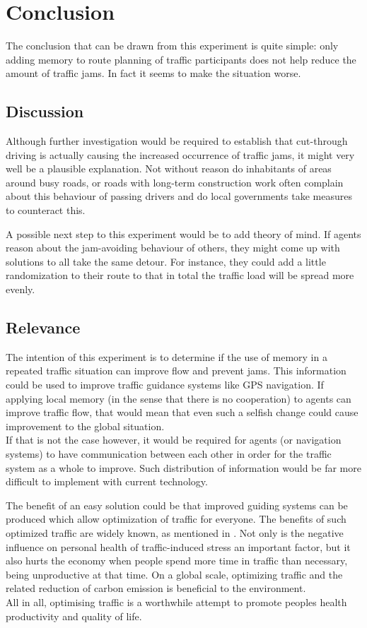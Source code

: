 \documentclass[a4paper,hidelinks]{article}
\begin{document}
\section{Conclusion}
The conclusion that can be drawn from this experiment is quite simple: only adding memory to route planning of traffic participants does not help reduce the amount of traffic jams. In fact it seems to make the situation worse.

\subsection{Discussion}
Although further investigation would be required to establish that cut-through driving is actually causing the increased occurrence of traffic jams, it might very well be a plausible explanation. Not without reason do inhabitants of areas around busy roads, or roads with long-term construction work often complain about this behaviour of passing drivers and do local governments take measures to counteract this.

A possible next step to this experiment would be to add theory of mind. If agents reason about the jam-avoiding behaviour of others, they might come up with solutions to all take the same detour. For instance, they could add a little randomization to their route to that in total the traffic load will be spread more evenly.

\subsection{Relevance}
The intention of this experiment is to determine if the use of memory in a repeated traffic situation can improve flow and prevent jams. This information could be used to improve traffic guidance systems like GPS navigation. If applying local memory (in the sense that there is no cooperation) to agents can improve traffic flow, that would mean that even such a selfish change could cause improvement to the global situation. \\
If that is not the case however, it would be required for agents (or navigation systems) to have communication between each other in order for the traffic system as a whole to improve. Such distribution of information would be far more difficult to implement with current technology.

The benefit of an easy solution could be that improved guiding systems can be produced which allow optimization of traffic for everyone. The benefits of such optimized traffic are widely known, as mentioned in \cite{france2003multiagent}. Not only is the negative influence on personal health of traffic-induced stress an important factor, but it also hurts the economy when people spend more time in traffic than necessary, being unproductive at that time. On a global scale, optimizing traffic and the related reduction of carbon emission is beneficial to the environment. \\
All in all, optimising traffic is a worthwhile attempt to promote peoples health productivity and quality of life. 




\end{document}
